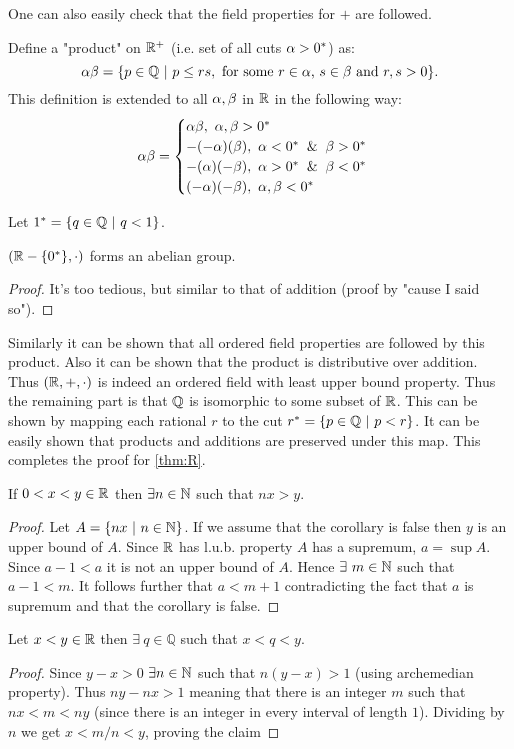 One can also easily check that the field properties for $+$ are followed.
\begin{definition}
  Define a "product" on $\mathbb{R}^+$ (i.e. set of all cuts $\alpha > 0^*$) as:
  \[\alpha \beta = \{p\in \mathbb{Q}\ |\ p\leq rs,\ \text{for some $r\in \alpha$, $s\in \beta$ and $r,s>0$}\}.\]
  This definition is extended to all $\alpha,\beta$ in $\mathbb{R}$ in the following way:
  \begin{align*}
    \a\b = \begin{cases}
      \a\b,\ \a,\b>0^*\\
      -(-\a)(\b),\ \a<0^* \And \b > 0^*\\
      -(\a)(-\b),\ \a>0^* \And \b < 0^*\\
      (-\a)(-\b),\ \a,\b<0^*\\
    \end{cases}
  \end{align*}
\end{definition}
\begin{definition}
  Let $1^* = \{q\in \Q\ |\ q<1\}$.
\end{definition}
\begin{proposition}
  $(\mathbb{R} - \{0^*\}, \cdot)$ forms an abelian group.
\end{proposition}
\begin{proof}
  It's too tedious, but similar to that of addition (proof by "cause I said so").
\end{proof}
Similarly it can be shown that all ordered field properties are followed by this product. Also it can be shown that the product is distributive over addition. Thus $(\mathbb{R},+,\cdot)$ is indeed an ordered field with least upper bound property. Thus the remaining part is that $\mathbb{Q}$ is isomorphic to some subset of $\mathbb{R}$. This can be shown by mapping each rational $r$ to the cut $r^* = \{p\in \Q\ |\ p<r\}$. It can be easily shown that products and additions are preserved under this map. This completes the proof for \cref{thm:R}.
\begin{corollary}
  If $0<x<y\in \mathbb{R}$ then $\exists n\in \mathbb{N}$ such that $nx>y$.
\end{corollary}
\begin{proof}
  Let $A = \{nx\ |\ n\in \mathbb{N}\}$. If we assume that the corollary is false then $y$ is an upper bound of $A$. Since $\mathbb{R}$ has l.u.b. property $A$ has a supremum, $a = \sup A$. Since $a - 1< a$ it is not an upper bound of $A$. Hence $\exists\ m\in \mathbb{N}$ such that $a-1<m$. It follows further that $a<m+1$ contradicting the fact that $a$ is supremum and that the corollary is false. 
\end{proof}
\begin{corollary}
  Let $x<y\in \mathbb{R}$ then $\exists\ q\in \mathbb{Q}$ such that $x<q<y$.
\end{corollary}
\begin{proof}
  Since $y-x>0$ $\exists n \in \mathbb{N}$ such that $n(y-x)>1$ (using archemedian property). Thus $ny - nx >1$ meaning that there is an integer $m$ such that $nx<m<ny$ (since there is an integer in every interval of length $1$). Dividing by $n$ we get $x<m/n<y$, proving the claim
\end{proof}
